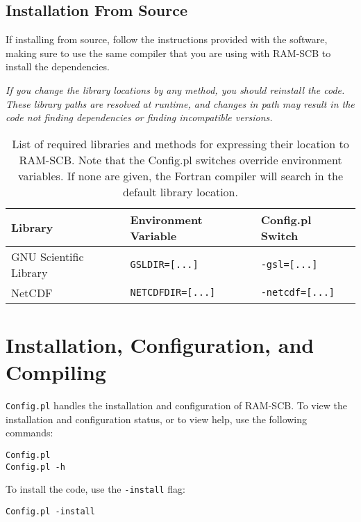 \subsection{Installation From Source}

If installing from source, follow the instructions provided with the software, making sure to use the same compiler that you are using with RAM-SCB to install the dependencies.

\emph{If you change the library locations by any method, you should reinstall the code. These library paths are resolved at runtime, and changes in path may result in the code not finding dependencies or finding incompatible versions.} 

\begin{table}[ht]
  \centering
  \begin{tabular}{l l l}
  \hline\hline
  Library & Environment Variable & Config.pl Switch\\
  \hline
  GNU Scientific Library & {\tt GSLDIR=[...]} & {\tt -gsl=[...]}\\
  NetCDF & {\tt NETCDFDIR=[...]} & {\tt -netcdf=[...]}\\
  \end{tabular}
\caption{List of required libraries and methods for expressing their location to RAM-SCB. Note that the Config.pl switches override environment variables. If none are given, the Fortran compiler will search in the default library location.}
\label{tab:libs}
\end{table}

\section{Installation, Configuration, and Compiling \label{subchap:install}}
{\tt Config.pl} handles the installation and configuration of RAM-SCB. To view the installation and configuration status, or to view help, use the following commands:
\begin{verbatim}
Config.pl
Config.pl -h
\end{verbatim}

To install the code, use the {\tt -install} flag:

\begin{verbatim}
Config.pl -install
\end{verbatim}



